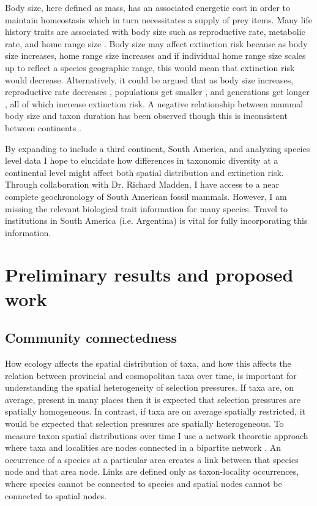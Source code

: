 \documentclass[11pt,letterpaper]{article}
\begin{document}
Body size, here defined as mass, has an associated energetic cost in order to maintain homeostasis which in turn necessitates a supply of prey items. Many life history traits are associated with body size such as reproductive rate, metabolic rate, and home range size \cite{Peters1983a,Damuth1979,Brown1987,Smith2004}. Body size may affect extinction risk because as body size increases, home range size increases \citep{Damuth1979} and if individual home range size scales up to reflect a species geographic range, this would mean that extinction risk would decrease. Alternatively, it could be argued that as body size increases, reproductive rate decreases \citep{Johnson2002b}, populations get smaller \citep{White2007}, and generations get longer \citep{Martin1993a}, all of which increase extinction risk. A negative relationship between mammal body size and taxon duration has been observed \citep{Liow2008,Davidson2012} though this is inconsistent between continents \citep{Tomiya2013,Liow2008}. 

By expanding to include a third continent, South America, and analyzing species level data I hope to elucidate how differences in taxonomic diversity at a continental level might affect both spatial distribution and extinction risk. Through collaboration with Dr. Richard Madden, I have access to a near complete geochronology of South American fossil mammals. However, I am missing the relevant biological trait information for many species. Travel to institutions in South America (i.e. Argentina) is vital for fully incorporating this information.

\section{Preliminary results and proposed work}
\subsection{Community connectedness}
How ecology affects the spatial distribution of taxa, and how this affects the relation between provincial and cosmopolitan taxa over time, is important for understanding the spatial heterogeneity of selection pressures. If taxa are, on average, present in many places then it is expected that selection pressures are spatially homogeneous. In contrast, if taxa are on average spatially restricted, it would be expected that selection pressures are spatially heterogeneous. To measure taxon spatial distributions over time I use a network theoretic approach where taxa and localities are nodes connected in a bipartite network \citep{Sidor2013,Vilhena2013,Vilhena2013b}. An occurrence of a species at a particular area creates a link between that species node and that area node. Links are defined only as taxon-locality occurrences, where species cannot be connected to species and spatial nodes cannot be connected to spatial nodes. %
\end{document}

